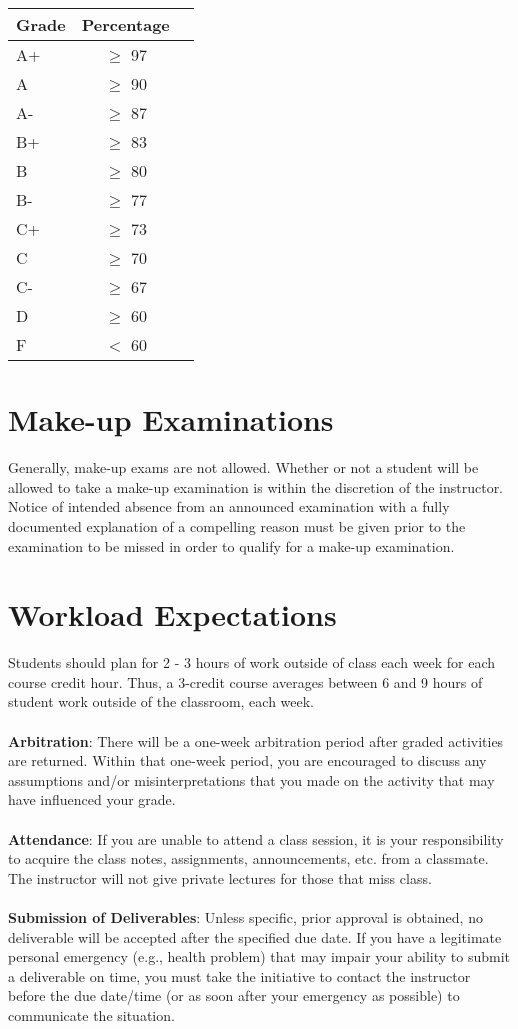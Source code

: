\documentclass[a4paper, 12pt]{article}
\begin{document}
\begin{center}
	\begin{tabular}{lcr}
		\hline
		Grade & Percentage\\
		\hline
		A+ & $\geq$ 97\\
		A & $\geq$ 90\\
		A- & $\geq$ 87\\
		B+ & $\geq$ 83\\
		B & $\geq$ 80\\
		B- & $\geq$ 77\\
		C+ & $\geq$ 73\\
		C & $\geq$ 70\\
		C- & $\geq$ 67\\
		D & $\geq$ 60\\
		F & $<$ 60\\
		\hline 
	\end{tabular}
\end{center}

\section{Make-up Examinations}
Generally, make-up exams are not allowed.  Whether or not a student will be allowed to take a make-up examination is within the discretion of the instructor.  Notice of intended absence from an announced examination with a fully documented explanation of a compelling reason must be given prior to the examination to be missed in order to qualify for a make-up examination.

\section{Workload Expectations}
Students should plan for 2 - 3 hours of work outside of class each week for each course credit hour. Thus, a 3-credit course averages between 6 and 9 hours of student work outside of the classroom, each week.
\\
\\
\textbf{Arbitration}: There will be a one-week arbitration period after graded activities are returned. Within that one-week period, you are encouraged to discuss any assumptions and/or misinterpretations that you made on the activity that may have inﬂuenced your grade.
\\
\\
\textbf{Attendance}: If you are unable to attend a class session, it is your responsibility to acquire the class notes, assignments, announcements, etc. from a classmate. The instructor will not give private lectures for those that miss class.
\\
\\
\textbf{Submission of Deliverables}: Unless speciﬁc, prior approval is obtained, no deliverable will be accepted after the speciﬁed due date. If you have a legitimate personal emergency (e.g., health problem) that may impair your ability to submit a deliverable on time, you must take the initiative to contact the instructor before the due date/time (or as soon after your emergency as possible) to communicate the situation. 
\end{document}

